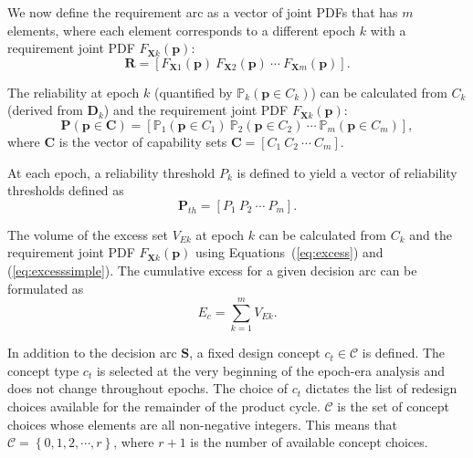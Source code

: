 We now define the requirement arc as a vector of joint \acp{PDF} that has $m$ elements, where each element corresponds to a different epoch $k$ with a requirement joint \ac{PDF} $F_{\mathbf{X}k}(\mathbf{p})$:
%
\begin{equation} \label{eq:requirementarc}
	\mathbf{R} = \left[F_{\mathbf{X}1}(\mathbf{p}) ~ F_{\mathbf{X}2}(\mathbf{p}) ~ \cdots ~ F_{\mathbf{X}m}(\mathbf{p})\right].%
\end{equation}

The reliability at epoch $k$ (quantified by $\mathbb{P}_k(\mathbf{p} \in C_k)$) can be calculated from $C_k$ (derived from $\mathbf{D}_k$) and the requirement joint \ac{PDF} $F_{\mathbf{X}k}(\mathbf{p})$:
%
\begin{equation} \label{eq:reliabilityvector}
	\mathbf{P}(\mathbf{p} \in \mathbf{C}) = \left[\mathbb{P}_1(\mathbf{p} \in C_1) ~ \mathbb{P}_2(\mathbf{p} \in C_2) ~ \cdots ~ \mathbb{P}_m(\mathbf{p} \in C_m)\right],%
\end{equation}
%
where $\mathbf{C}$ is the vector of capability sets $\mathbf{C} = \left[C_1 ~ C_2 ~ \cdots ~ C_m\right]$.%

At each epoch, a reliability threshold $P_k$ is defined to yield a vector of reliability thresholds defined as
%
\begin{equation} \label{eq:reliabilitythvector}
	\mathbf{P}_{th} = \left[P_1 ~ P_2 ~ \cdots ~ P_m\right].%
\end{equation}

The volume of the excess set $V_{Ek}$ at epoch $k$ can be calculated from $C_k$ and the requirement joint \ac{PDF} $F_{\mathbf{X}k}(\mathbf{p})$ using Equations~(\ref{eq:excess}) and (\ref{eq:excesssimple}).
The cumulative excess for a given decision arc can be formulated as
%
\begin{equation} \label{eq:excesscumulative}
	E_c = \sum\limits_{k=1}^{m} V_{Ek}.
\end{equation}

In addition to the decision arc $\mathbf{S}$, a fixed design concept $c_t\in\mathcal{C}$ is defined. The concept type $c_t$ is selected at the very beginning of the epoch-era analysis and does not change throughout epochs. The choice of $c_t$ dictates the list of redesign choices available for the remainder of the product cycle. $\mathcal{C}$ is the set of concept choices whose elements are all non-negative integers. This means that $\mathcal{C} = \left\{0,1,2,\cdots,r\right\}$, where $r + 1$ is the number of available concept choices.

